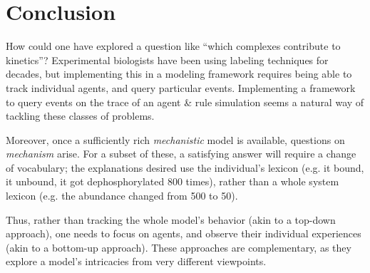 \documentclass[runningheads]{llncs}
\begin{document}

\iffalse
The regularity requirement may seem restrictive. However, the first
users of our query engine never expressed any frustration due to the
regularity requirement, despite not being aware of this limitation:
they naturally came up with regular queries
only.\footnote{Furthermore, they would also write the clauses of their
  patterns in an order that reflects their dependency trees.}  In our
opinion, this is due to the difficulty of interpreting non-regular
queries operationally.
\fi







\section{Conclusion}

How could one have explored a question like ``which complexes contribute to kinetics''? Experimental biologists have been using labeling techniques for decades, but implementing this in a modeling framework requires being able to track individual agents, and query particular events. Implementing a framework to query events on the trace of an agent \& rule simulation seems a natural way of tackling these classes of problems.

Moreover, once a sufficiently rich \emph{mechanistic} model is available, questions on \emph{mechanism} arise. For a subset of these, a satisfying answer will require a change of vocabulary; the explanations desired use the individual's lexicon (e.g. it bound, it unbound, it got dephosphorylated 800 times), rather than a whole system lexicon (e.g. the abundance changed from 500 to 50).

Thus, rather than tracking the whole model's behavior (akin to a top-down approach), one needs to focus on agents, and observe their individual experiences (akin to a bottom-up approach). These approaches are complementary, as they explore a model's intricacies from very different viewpoints.



% 



\nocite{*}  

\newpage

\appendix



%
\end{document}
